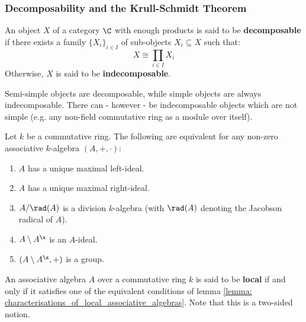         \subsubsection{Decomposability and the Krull-Schmidt Theorem}
            \begin{definition} \label{def: (in)decomposable_objects}
                An object $X$ of a category $\C$ with enough products is said to be \textbf{decomposable} if there exists a family $\{X_i\}_{i \in I}$ of sub-objects $X_i \subseteq X$ such that:
                    $$X \cong \prod_{i \in I} X_i$$
                Otherwise, $X$ is said to be \textbf{indecomposable}.
            \end{definition}
            \begin{remark}
                Semi-simple objects are decomposable, while simple objects are always indecomposable. There can - however - be indecomposable objects which are not simple (e.g. any non-field commutative ring as a module over itself). 
            \end{remark}
            \begin{lemma} \label{lemma: characterisations_of_local_associative_algebras}
                \cite[Theorem 19.1]{lam_first_course_in_noncommutative_rings} Let $k$ be a commutative ring. The following are equivalent for any non-zero associative $k$-algebra $(A, +, \cdot)$:
                    \noindent
                    \begin{enumerate}
                        \item $A$ has a unique maximal left-ideal.
                        \item $A$ has a unique maximal right-ideal. 
                        \item $A/\rad(A)$ is a division $k$-algebra (with $\rad(A)$ denoting the Jacobson radical of $A$).
                        \item $A \setminus A^{\x}$ is an $A$-ideal.
                        \item $(A \setminus A^{\x}, +)$ is a group. 
                    \end{enumerate}
            \end{lemma}
            \begin{definition} \label{def: local_associative_algebras}
                An associative algebra $A$ over a commutative ring $k$ is said to be \textbf{local} if and only if it satisfies one of the equivalent conditions of lemma \ref{lemma: characterisations_of_local_associative_algebras}. Note that this is a two-sided notion.
            \end{definition}

